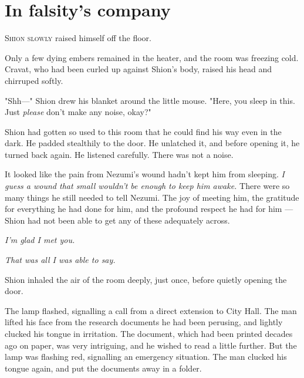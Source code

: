 
\chapter{In falsity's company}


\lettrine{S}{hion slowly} raised himself off the floor.

Only a few dying embers remained in the heater, and the room was
freezing cold. Cravat, who had been curled up against Shion's body,
raised his head and chirruped softly.

"Shh---" Shion drew his blanket around the little mouse. "Here, you sleep
in this. Just \emph{please} don't make any noise, okay?"

Shion had gotten so used to this room that he could find his way even in
the dark. He padded stealthily to the door. He unlatched it, and before
opening it, he turned back again. He listened carefully. There was not a
noise.

It looked like the pain from Nezumi's wound hadn't kept him from
sleeping. \emph{I guess a wound that small wouldn't be enough to keep him
awake.} There were so many things he still needed to tell Nezumi. The joy
of meeting him, the gratitude for everything he had done for him, and
the profound respect he had for him --- Shion had not been able to get any
of these adequately across.

\emph{I'm glad I met you.}

\emph{That was all I was able to say.}

Shion inhaled the air of the room deeply, just once, before quietly
opening the door.

\mybreak

The lamp flashed, signalling a call from a direct extension to City
Hall. The man lifted his face from the research documents he had been
perusing, and lightly clucked his tongue in irritation. The document,
which had been printed decades ago on paper, was very intriguing, and he
wished to read a little further. But the lamp was flashing red,
signalling an emergency situation. The man clucked his tongue again, and
put the documents away in a folder.


